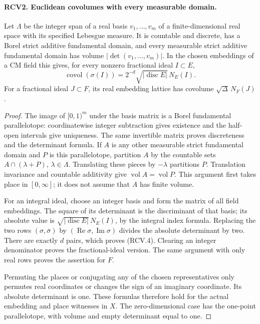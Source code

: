 \documentclass[11pt,a4paper]{article}
\numberwithin{equation}{section}
\theoremstyle{remark}\newtheorem{remark}[theorem]{Remark}
\begin{document}
\paragraph{RCV2. Euclidean covolumes with every measurable domain.}
\label{claim:RCV2}
Let \(\Lambda\) be the integer span of a real basis
\(v_1,\ldots,v_m\) of a finite-dimensional real space with its specified
Lebesgue measure.  It is countable and discrete, has a Borel strict
additive fundamental domain, and every measurable strict additive
fundamental domain has volume \(|\det(v_1,\ldots,v_m)|\).
In the chosen embeddings of a CM field this gives, for every nonzero
fractional ideal \(I\subset E\),
\[
 \operatorname{covol}(\sigma(I))
 =2^{-d}\sqrt{|\operatorname{disc}E|}\,N_E(I).
\tag{RCV.4}
\]
For a fractional ideal \(J\subset F\), its real embedding lattice has
covolume \(\sqrt{\Delta}\,N_F(J)\).
\begin{proof}
The image of \([0,1)^m\) under the basis matrix is a Borel fundamental
parallelotope: coordinatewise integer subtraction gives existence
and the half-open intervals give uniqueness.  The same invertible
matrix proves discreteness and the determinant formula.  If \(A\)
is any other measurable strict fundamental domain and \(P\) is this
parallelotope, partition \(A\) by the countable sets
\(A\cap(\lambda+P)\), \(\lambda\in\Lambda\).  Translating these
pieces by \(-\lambda\) partitions \(P\).  Translation invariance
and countable additivity give \(\operatorname{vol}A=
\operatorname{vol}P\).  This argument first takes place in
\([0,\infty]\); it does not assume that \(A\) has finite volume.

For an integral ideal, choose an integer basis and form the matrix
of all field embeddings.  The square of its determinant is the
discriminant of that basis; its absolute value is
\(\sqrt{|\operatorname{disc}E|}\,N_E(I)\), by the integral index
formula.  Replacing the two rows \((\sigma,\bar\sigma)\) by
\((\operatorname{Re}\sigma,\operatorname{Im}\sigma)\) divides
the absolute determinant by two.  There are exactly \(d\) pairs,
which proves (RCV.4).  Clearing an integer denominator proves the
fractional-ideal version.  The same argument with only real rows
proves the assertion for \(F\).

Permuting the places or conjugating any of the chosen representatives
only permutes real coordinates or changes the sign of an imaginary
coordinate.  Its absolute determinant is one.  These formulas
therefore hold for the actual embedding and place witnesses in
\(X\).  The zero-dimensional case has the one-point parallelotope,
with volume and empty determinant equal to one.
\end{proof}
\end{document}
